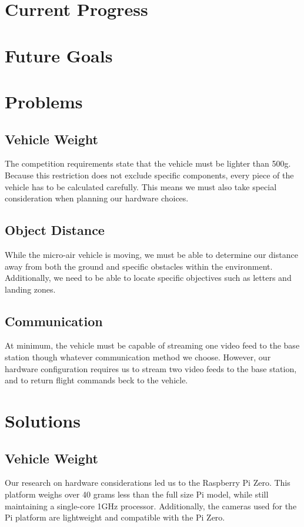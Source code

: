 \documentclass[onecolumn, draftclsnofoot,10pt, compsoc]{IEEEtran}
\begin{document}
\section{Current Progress}



\section{Future Goals}



\section{Problems}

\subsection{Vehicle Weight}
The competition requirements state that the vehicle must be lighter than 500g. Because this restriction does not exclude specific components, every piece of the vehicle has to be calculated carefully. This means we must also take special consideration when planning our hardware choices.

\subsection{Object Distance}
While the micro-air vehicle is moving, we must be able to determine our distance away from both the ground and specific obstacles within the environment. Additionally, we need to be able to locate specific objectives such as letters and landing zones.

\subsection{Communication}
At minimum, the vehicle must be capable of streaming one video feed to the base station though whatever communication method we choose. However, our hardware configuration requires us to stream two video feeds to the base station, and to return flight commands beck to the vehicle. 


\section{Solutions}

\subsection{Vehicle Weight}
Our research on hardware considerations led us to the Raspberry Pi Zero. This platform weighs over 40 grams less than the full size Pi model, while still maintaining a single-core 1GHz processor. Additionally, the cameras used for the Pi platform are lightweight and compatible with the Pi Zero.
\end{document}
